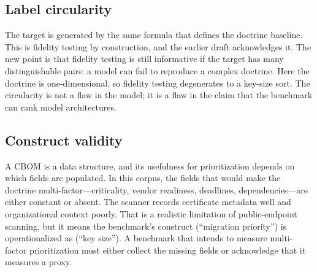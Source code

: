 \documentclass[conference,10pt]{IEEEtran}
\begin{document}
\subsection{Label circularity}
The target is generated by the same formula that defines the doctrine baseline. This is fidelity
testing by construction, and the earlier draft acknowledges it. The new point is that fidelity
testing is still informative if the target has many distinguishable pairs: a model can fail to
reproduce a complex doctrine. Here the doctrine is one-dimensional, so fidelity testing
degenerates to a key-size sort. The circularity is not a flaw in the model; it is a flaw in the
claim that the benchmark can rank model architectures.

\subsection{Construct validity}
A CBOM is a data structure, and its usefulness for prioritization depends on which fields are
populated. In this corpus, the fields that would make the doctrine multi-factor---criticality,
vendor readiness, deadlines, dependencies---are either constant or absent. The scanner records
certificate metadata well and organizational context poorly. That is a realistic limitation of
public-endpoint scanning, but it means the benchmark's construct (``migration priority'') is
operationalized as (``key size''). A benchmark that intends to measure multi-factor
prioritization must either collect the missing fields or acknowledge that it measures a proxy.
\end{document}
